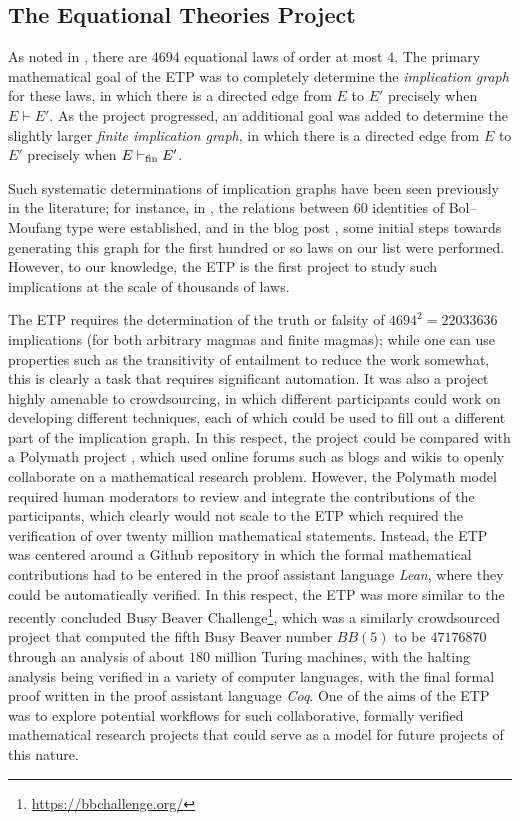 \subsection{The Equational Theories Project}

As noted in , there are $4694$ equational laws of order at most $4$. The primary mathematical goal of the ETP was to completely determine the \emph{implication graph} for these laws, in which there is a directed edge from $E$ to $E'$ precisely when $E \vdash E'$. As the project progressed, an additional goal was added to determine the slightly larger \emph{finite implication graph}, in which there is a directed edge from $E$ to $E'$ precisely when $E \vdash_{\mathrm{fin}} E'$.

Such systematic determinations of implication graphs have been seen previously in the literature; for instance, in \cite{phillips-vojtechovsky}, the relations between $60$ identities of Bol--Moufang type were established, and in the blog post \cite[\S 17]{Wolfram_2022}, some initial steps towards generating this graph for the first hundred or so laws on our list were performed. However, to our knowledge, the ETP is the first project to study such implications at the scale of thousands of laws.

The ETP requires the determination of the truth or falsity of $4694^2 = 22033636$ implications (for both arbitrary magmas and finite magmas); while one can use properties such as the transitivity of entailment to reduce the work somewhat, this is clearly a task that requires significant automation. It was also a project highly amenable to crowdsourcing, in which different participants could work on developing different techniques, each of which could be used to fill out a different part of the implication graph. In this respect, the project could be compared with a Polymath project \cite{Gowers2009}, which used online forums such as blogs and wikis to openly collaborate on a mathematical research problem. However, the Polymath model required human moderators to review and integrate the contributions of the participants, which clearly would not scale to the ETP which required the verification of over twenty million mathematical statements. Instead, the ETP was centered around a Github repository in which the formal mathematical contributions had to be entered in the proof assistant language \emph{Lean}, where they could be automatically verified. In this respect, the ETP was more similar to the recently concluded Busy Beaver Challenge\footnote{\url{https://bbchallenge.org/}}, which was a similarly crowdsourced project that computed the fifth Busy Beaver number $BB(5)$ to be $47176870$ through an analysis of about $180$ million Turing machines, with the halting analysis being verified in a variety of computer languages, with the final formal proof written in the proof assistant language \emph{Coq}. One of the aims of the ETP was to explore potential workflows for such collaborative, formally verified mathematical research projects that could serve as a model for future projects of this nature.

